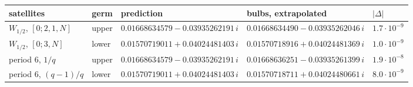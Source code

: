 \begin{tabular}{@{}lllll@{}}
\toprule
satellites & germ & prediction & bulbs, extrapolated & $|\Delta|$ \\
\midrule
$W_{1/2}$, $[0;2,1,N]$ & upper & $0.01668634579 - 0.03935262191\,i$ & $0.01668634490 - 0.03935262046\,i$ & $1.7\cdot10^{-9}$ \\
$W_{1/2}$, $[0;3,N]$ & lower & $0.01570719011 + 0.04024481403\,i$ & $0.01570718916 + 0.04024481369\,i$ & $1.0\cdot10^{-9}$ \\
period $6$, $1/q$ & upper & $0.01668634579 - 0.03935262191\,i$ & $0.01668636251 - 0.03935261399\,i$ & $1.9\cdot10^{-8}$ \\
period $6$, $(q-1)/q$ & lower & $0.01570719011 + 0.04024481403\,i$ & $0.01570718711 + 0.04024480661\,i$ & $8.0\cdot10^{-9}$ \\
\bottomrule
\end{tabular}
